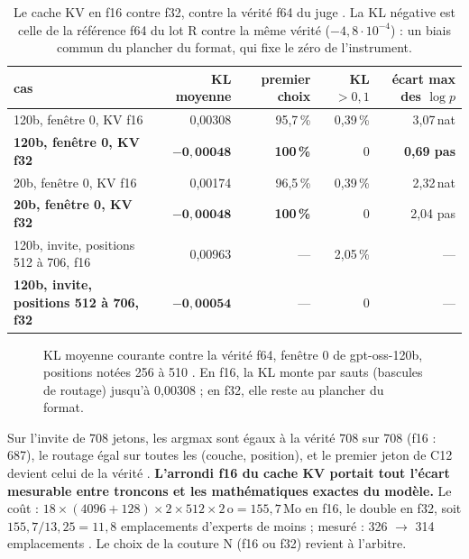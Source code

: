 \begin{table}[!htbp]
\centering\small
\caption[Le cache KV en f16 contre f32]{Le cache KV en f16 contre f32, contre la vérité f64 du juge \mes. La KL négative est celle de la référence f64 du lot R contre la même vérité ($-4{,}8\cdot10^{-4}$) : un biais commun du plancher du format, qui fixe le zéro de l'instrument.}
\label{tab:t2n-kv}
\begin{tabular}{@{}lrrrr@{}}
\toprule
cas & KL moyenne & premier choix & KL $> 0{,}1$ & écart max des $\log p$ \\
\midrule
120b, fenêtre 0, KV f16 & 0,00308 & 95,7\,\% & 0,39\,\% & 3,07\,nat \\
\textbf{120b, fenêtre 0, KV f32} & $\mathbf{-0{,}00048}$ & \textbf{100\,\%} & 0 & \textbf{0,69 pas} \\
20b, fenêtre 0, KV f16 & 0,00174 & 96,5\,\% & 0,39\,\% & 2,32\,nat \\
\textbf{20b, fenêtre 0, KV f32} & $\mathbf{-0{,}00048}$ & \textbf{100\,\%} & 0 & 2,04 pas \\
120b, invite, positions 512 à 706, f16 & 0,00963 & — & 2,05\,\% & — \\
\textbf{120b, invite, positions 512 à 706, f32} & $\mathbf{-0{,}00054}$ & — & 0 & — \\
\bottomrule
\end{tabular}
\end{table}

\begin{figure}[!htbp]
\centering
\GrapheNoyKV
\caption[Le cache KV : f16 contre f32, 120b]{KL moyenne courante contre la vérité f64, fenêtre 0 de gpt-oss-120b, positions notées 256 à 510 \mes. En f16, la KL monte par sauts (bascules de routage) jusqu'à 0,00308 ; en f32, elle reste au plancher du format.}
\label{fig:t2n-kv}
\end{figure}

Sur l'invite de 708 jetons, les argmax sont égaux à la vérité 708 sur 708 (f16 : 687), le routage égal sur toutes les (couche, position), et le premier jeton de C12 devient celui de la vérité \mes. \textbf{L'arrondi f16 du cache KV portait tout l'écart mesurable entre troncons et les mathématiques exactes du modèle.} Le coût : $18 \times (\num{4096} + 128) \times 2 \times 512 \times 2\,\text{o} = 155{,}7$\,Mo en f16, le double en f32, soit $155{,}7 / 13{,}25 = 11{,}8$ emplacements d'experts de moins \calc ; mesuré : 326 $\to$ 314 emplacements \mes. Le choix de la couture N (f16 ou f32) revient à l'arbitre.

